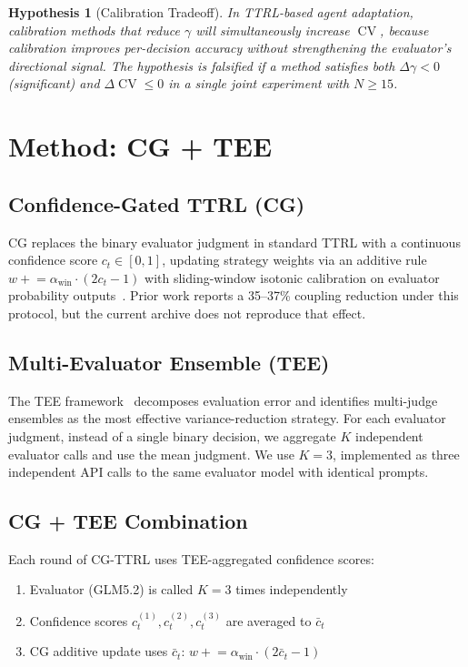 \documentclass[11pt]{article}
\DeclareMathOperator{\CV}{CV}
\newtheorem{hypothesis}{Hypothesis}
\begin{document}
\begin{hypothesis}[Calibration Tradeoff]
In TTRL-based agent adaptation, calibration methods that reduce $\gamma$ will simultaneously increase $\CV$, because calibration improves per-decision accuracy without strengthening the evaluator's directional signal. The hypothesis is falsified if a method satisfies \textit{both} $\Delta\gamma < 0$ (significant) \textit{and} $\Delta\CV \leq 0$ in a single joint experiment with $N \geq 15$.
\end{hypothesis}

\section{Method: CG + TEE}

\subsection{Confidence-Gated TTRL (CG)}

CG replaces the binary evaluator judgment in standard TTRL with a continuous confidence score $c_t \in [0,1]$, updating strategy weights via an additive rule $w \mathrel{+}= \alpha_{\text{win}} \cdot (2c_t - 1)$ with sliding-window isotonic calibration on evaluator probability outputs~\cite{liu2026caleffects}. Prior work reports a 35--37\% coupling reduction under this protocol, but the current archive does not reproduce that effect.

\subsection{Multi-Evaluator Ensemble (TEE)}

The TEE framework~\cite{messing2026tee} decomposes evaluation error and identifies multi-judge ensembles as the most effective variance-reduction strategy. For each evaluator judgment, instead of a single binary decision, we aggregate $K$ independent evaluator calls and use the mean judgment. We use $K{=}3$, implemented as three independent API calls to the same evaluator model with identical prompts.

\subsection{CG + TEE Combination}

Each round of CG-TTRL uses TEE-aggregated confidence scores:
\begin{enumerate}[leftmargin=*,nosep]
 \item Evaluator (GLM5.2) is called $K{=}3$ times independently
 \item Confidence scores $c_t^{(1)}, c_t^{(2)}, c_t^{(3)}$ are averaged to $\bar{c}_t$
 \item CG additive update uses $\bar{c}_t$: $w \mathrel{+}= \alpha_{\text{win}} \cdot (2\bar{c}_t - 1)$
\end{enumerate}
\end{document}
